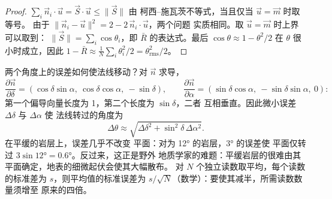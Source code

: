 \begin{proof}
$\sum_i \vec n_i\cdot\vec u = \vec S\cdot\vec u \le \|\vec S\|$ 由
柯西–施瓦茨不等式，当且仅当 $\vec u = \vec m$ 时取等号。
由于 $\|\vec n_i - \vec u\|^2 = 2 - 2\,\vec n_i\cdot\vec u$，两个问题
实质相同。取 $\vec u = \vec m$ 时上界可以取到：
$\|\vec S\| = \sum_i\cos\theta_i$，即 $\bar R$ 的表达式。最后
$\cos\theta \approx 1 - \theta^2/2$ 在 $\theta$ 很小时成立，因此 $1 - \bar R \approx
\frac1N\sum_i\theta_i^2/2 = \theta_{\text{rms}}^2/2$。
\end{proof}

两个角度上的误差如何使法线移动？对 $\vec n$ 求导，
\[
  \frac{\partial\vec n}{\partial\delta} = (\cos\delta\sin\alpha,\ \cos\delta\cos\alpha,\ -\sin\delta),
  \qquad
  \frac{\partial\vec n}{\partial\alpha} = (\sin\delta\cos\alpha,\ -\sin\delta\sin\alpha,\ 0):
\]
第一个偏导向量长度为 1，第二个长度为 $\sin\delta$，二者
互相垂直。因此微小误差 $\Delta\delta$ 与 $\Delta\alpha$ 使
法线转过的角度为
\[
  \Delta\theta \approx \sqrt{\Delta\delta^2 + \sin^2\delta\,\Delta\alpha^2}.
\]
在平缓的岩层上，误差几乎不改变
平面：对为 \ang{12} 的岩层，\ang{3} 的误差使
平面仅转过 $3\sin\ang{12} = \ang{0.6}$。反过来，这正是野外
地质学家的难题：平缓岩层的很难由其
平面确定，地表的细微起伏会使其大幅散布。
对 $N$ 个独立读数取平均，每个读数的标准差为
$s$，则平均值的标准误差为 $s/\sqrt N$（数学）：要使其减半，所需读数数量须增至
原来的四倍。

